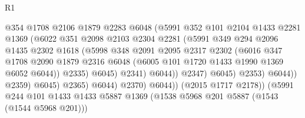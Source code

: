 \begin{lexlean}{R1}
\begin{coremodule}
                                    @354
                                    @1708
                                    @2106
                                    @1879
                                    @2283
                                    @6048
                                    (@5991
                                      @352
                                      @101
                                      @2104
                                      @1433
                                      @2281
                                      @1369
                                      (@6022
                                        @351
                                        @2098
                                        @2103
                                        @2304
                                        @2281
                                        (@5991
                                          @349
                                          @294
                                          @2096
                                          @1435
                                          @2302
                                          @1618
                                          (@5998
                                            @348
                                            @2091
                                            @2095
                                            @2317
                                            @2302
                                            (@6016
                                              @347
                                              @1708
                                              @2090
                                              @1879
                                              @2316
                                              @6048
                                              (@6005 @101 @1720 @1433 @1990 @1369 @6052 @6044))
                                            @2335)
                                          @6045)
                                        @2341)
                                      @6044))
                                  @2347)
                                @6045)
                              @2353)
                            @6044))
                        @2359)
                      @6045)
                    @2365)
                  @6044)
                @2370)
              @6044))
          (@2015 @1717 @2178))
        (@5991
          @244
          @101
          @1433
          @1433
          @5887
          @1369
          (@1538 @5968 @201 @5887 (@1543 (@1544 @5968 @201)))

\end{coremodule}
\end{lexlean}

